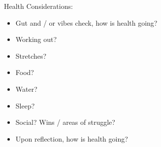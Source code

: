 
	\item Health Considerations:
	\begin{itemize}
		\item Gut and / or vibes check, how is health going?

		\item Working out?
		
		\item Stretches?

		\item Food?

		\item Water?

		\item Sleep?

		\item Social? Wins / areas of struggle?

		\item Upon reflection, how is health going?

	\end{itemize}
